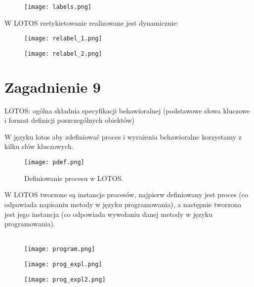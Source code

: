 \documentclass[a4paper,15pt]{article}
\newcommand{\example}[2]{
    \begin{tcolorbox}[colback=blue!5!white,colframe=blue,title={Przykład #1}]
        #2
    \end{tcolorbox}
}
\newcommand{\issue}[2]{
    \begin{tcolorbox}[colback=issueColor!5!white,colframe=issueColor,title={Zagadnienie #1}]
        #2
    \end{tcolorbox}
}
\begin{document}
\begin{figure}[H]
\centerline{\texttt{[image: labels.png]}}
\end{figure}

W LOTOS reetykietowanie realizowane jest dynamicznie:

\begin{figure}[H]
\centerline{\texttt{[image: relabel\_1.png]}}
\label{fig:program_expl}
\end{figure}

\begin{figure}[H]
\centerline{\texttt{[image: relabel\_2.png]}}
\label{fig:program_expl2}
\end{figure}






\newpage
\section{Zagadnienie 9}

\issue{9}{
LOTOS: ogólna składnia specyfikacji behawioralnej (podstawowe słowa
kluczowe i format definicji poszczególnych obiektów)
}


W języku lotos aby zdefiniować proces i wyrażenia behawioralne korzystamy z kilku słów kluczowych. 
\begin{figure}[H]
\centerline{\texttt{[image: pdef.png]}}
\caption{Definiowanie procesu w LOTOS.}
\label{fig:pdef}
\end{figure}


W LOTOS tworzone są instancje procesów, najpierw definiowany jest proces (co odpowiada napisaniu metody w języku programowania), a następnie tworzona jest jego instancja (co odpowiada wywołaniu danej metody w języku programowania). \\ \\


\example{}{
\begin{figure}[H]
\centerline{\texttt{[image: program.png]}}
\label{fig:program}
\end{figure}
}  

\begin{figure}[H]
\centerline{\texttt{[image: prog\_expl.png]}}
\label{fig:program_expl}
\end{figure}

\begin{figure}[H]
\centerline{\texttt{[image: prog\_expl2.png]}}
\label{fig:program_expl2}
\end{figure}
\end{document}
